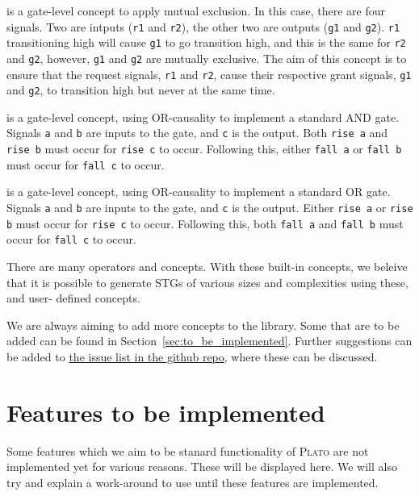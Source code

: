 \documentclass[british,technote,compsoc]{IEEEtran}
\newcommand{\noun}[1]{\textsc{#1}}
\begin{document}
\begin{description}[align=left]
  \item [\texttt{meElement r1 r2 g1 g2}] is a gate-level concept to apply mutual exclusion. In this case, there are four signals. Two are intputs (\texttt{r1} and \texttt{r2}), the other two 
  are outputs (\texttt{g1} and \texttt{g2}). \texttt{r1} transitioning high will cause \texttt{g1} to go transition high, and this is the same for \texttt{r2} and \texttt{g2}, however,
  \texttt{g1} and \texttt{g2} are mutually exclusive. The aim of this concept is to ensure that the request signals, \texttt{r1} and \texttt{r2}, cause their respective grant signals, 
  \texttt{g1} and \texttt{g2}, to transition high but never at the same time. 
  
  \item [\texttt{andGate a b c}] is a gate-level concept, using OR-causality to implement a standard AND gate. Signals \texttt{a} and \texttt{b} are inputs to the gate, and \texttt{c} is the 
  output. Both \texttt{rise a} and \texttt{rise b} must occur for \texttt{rise c} to occur. Following this, either \texttt{fall a} or \texttt{fall b} must occur for \texttt{fall c} to occur.
  
  \item [\texttt{orGate a b c}] is a gate-level concept, using OR-causality to implement a standard OR gate. Signals \texttt{a} and \texttt{b} are inputs to the gate, and \texttt{c} is the 
  output. Either \texttt{rise a} or \texttt{rise b} must occur for \texttt{rise c} to occur. Following this, both \texttt{fall a} and \texttt{fall b} must occur for \texttt{fall c} to occur. 
  
\end{description}

\noindent There are many operators and concepts. With these built-in concepts, we beleive that it is possible to generate STGs of various sizes and complexities using these, and user-
defined concepts. 

We are always aiming to add more concepts to the library. Some that are to be added can be found in Section~\ref{sec:to_be_implemented}. 
Further suggestions can be added to \href{https://github.com/tuura/concepts/issues}{the issue list in the github repo}, where these can be discussed.

\section{Features to be implemented \label{sec:to_be_implemented}}

Some features which we aim to be stanard functionality of \noun{Plato} are not implemented yet for various reasons. 
These will be displayed here. We will also try and explain a work-around to use until these features are implemented.
\end{document}
